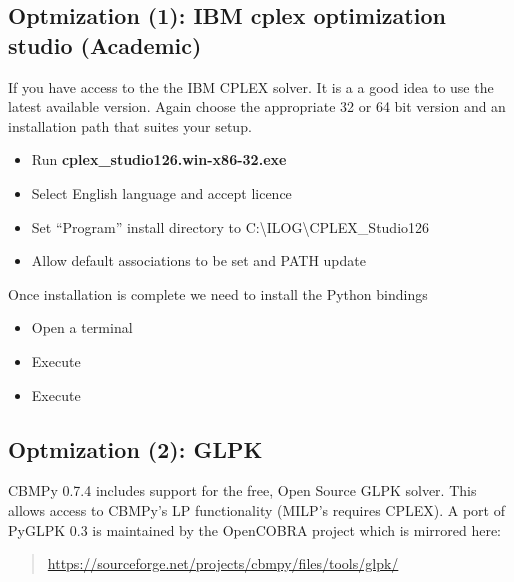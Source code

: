 \documentclass[a4paper,11pt,english]{sphinxmanual}
\begin{document}
\subsection{Optmization (1): IBM cplex optimization studio (Academic)}
\label{install_doc:optmization-1-ibm-cplex-optimization-studio-academic}
If you have access to the the IBM CPLEX solver. It is a a good idea to use the latest available version.
Again choose the appropriate 32 or 64 bit version and an installation path that suites your setup.
\begin{itemize}
\item {} 
Run \textbf{cplex\_studio126.win-x86-32.exe}

\item {} 
Select English language and accept licence

\item {} 
Set ``Program'' install directory to C:\textbackslash{}ILOG\textbackslash{}CPLEX\_Studio126

\item {} 
Allow default associations to be set and PATH update

\end{itemize}

Once installation is complete we need to install the Python bindings
\begin{itemize}
\item {} 
Open a terminal

\item {} 
Execute 

\item {} 
Execute 

\end{itemize}


\subsection{Optmization (2): GLPK}
\label{install_doc:optmization-2-glpk}
CBMPy 0.7.4 includes support for the free, Open Source GLPK solver. This allows access
to CBMPy's LP functionality (MILP's requires CPLEX). A port of PyGLPK 0.3
is maintained by the OpenCOBRA project which is mirrored here:
\begin{quote}

\href{https://sourceforge.net/projects/cbmpy/files/tools/glpk/}{https://sourceforge.net/projects/cbmpy/files/tools/glpk/}
\end{quote}
\end{document}
